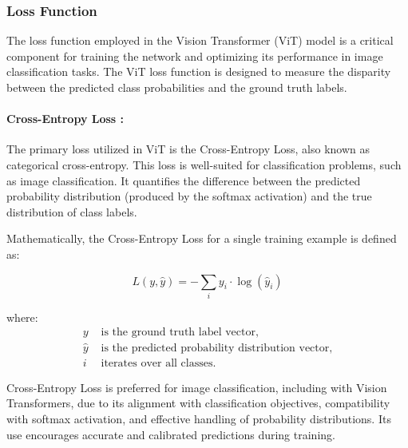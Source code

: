 \subsubsection{Loss Function}
The loss function employed in the Vision Transformer (ViT) model is a critical component for training the network and optimizing its performance in image classification tasks. The ViT loss function is designed to measure the disparity between the predicted class probabilities and the ground truth labels.

\paragraph{Cross-Entropy Loss :}
The primary loss utilized in ViT is the Cross-Entropy Loss, also known as categorical cross-entropy. This loss is well-suited for classification problems, such as image classification. It quantifies the difference between the predicted probability distribution (produced by the softmax activation) and the true distribution of class labels.

Mathematically, the Cross-Entropy Loss for a single training example is defined as:

\begin{equation}
    L(y, \hat{y}) = -\sum_i y_i \cdot \log(\hat{y}_i) \label{eq:loss_function}
\end{equation}

where:
\begin{align*}
    y       & \text{ is the ground truth label vector,}                 \\
    \hat{y} & \text{ is the predicted probability distribution vector,} \\
    i       & \text{ iterates over all classes.}
\end{align*}

Cross-Entropy Loss is preferred for image classification, including with Vision Transformers, due to its alignment with classification objectives, compatibility with softmax activation, and effective handling of probability distributions. Its use encourages accurate and calibrated predictions during training.

